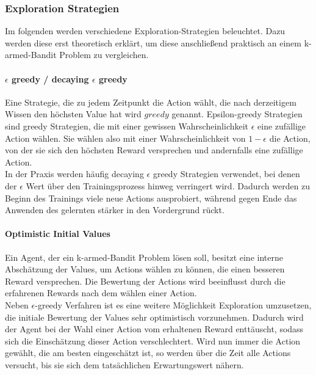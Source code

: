 \documentclass[11pt]{scrartcl}
\begin{document}
\subsubsection{Exploration Strategien}
Im folgenden werden verschiedene Exploration-Strategien beleuchtet. Dazu werden diese erst
theoretisch erklärt, um diese anschließend praktisch an einem k-armed-Bandit Problem zu
vergleichen.

\paragraph{$\epsilon$ greedy / decaying $\epsilon$ greedy}
Eine Strategie, die zu jedem Zeitpunkt die Action wählt, die nach derzeitigem Wissen den
höchsten Value hat wird $greedy$ genannt. Epsilon-greedy Strategien sind greedy
Strategien, die mit einer gewissen Wahrscheinlichkeit $\epsilon$ eine zufällige Action
wählen. Sie wählen also mit einer Wahrscheinlichkeit von $1 - \epsilon$ die Action, von
der sie sich den höchsten Reward versprechen und andernfalls eine zufällige Action.\\
In der Praxis werden häufig decaying $\epsilon$ greedy Strategien verwendet, bei denen der
$\epsilon$ Wert über den Trainingsprozess hinweg verringert wird. Dadurch werden zu Beginn
des Trainings viele neue Actions ausprobiert, während gegen Ende das Anwenden des
gelernten stärker in den Vordergrund rückt.

\paragraph{Optimistic Initial Values}
Ein Agent, der ein k-armed-Bandit Problem lösen soll, besitzt eine interne Abschätzung der
Values, um Actions wählen zu können, die einen besseren Reward versprechen. Die
Bewertung der Actions wird beeinflusst durch die erfahrenen Rewards nach dem wählen einer
Action.\\
Neben $\epsilon$-greedy Verfahren ist es eine weitere Möglichkeit Exploration umzusetzen,
die initiale Bewertung der Values sehr optimistisch vorzunehmen. Dadurch wird der Agent
bei der Wahl einer Action vom erhaltenen Reward \grqq enttäuscht\grqq, sodass sich die Einschätzung
dieser Action verschlechtert. Wird nun immer die Action gewählt, die am besten
eingeschätzt ist, so werden über die Zeit alle Actions versucht, bis sie sich dem
tatsächlichen Erwartungswert nähern.
\end{document}
